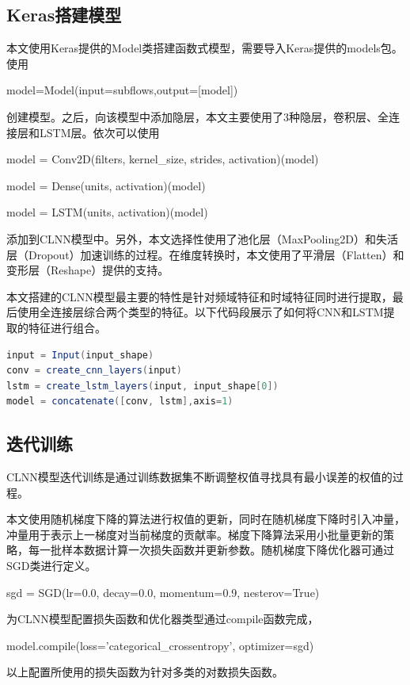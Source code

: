\subsection{Keras搭建模型}
本文使用Keras提供的Model类搭建函数式模型，需要导入Keras提供的models包。使用
\begin{center}
\monaco
model=Model(input=subflows,output=[model])
\end{center}
创建模型。之后，向该模型中添加隐层，本文主要使用了3种隐层，卷积层、全连接层和LSTM层。依次可以使用
\begin{center}
\monaco
model = Conv2D(filters, kernel\_size, strides, activation)(model)
\end{center}
\begin{center}
\monaco
model = Dense(units, activation)(model)
\end{center}
\begin{center}
\monaco
model = LSTM(units, activation)(model)
\end{center}
添加到CLNN模型中。另外，本文选择性使用了池化层（MaxPooling2D）和失活层（Dropout）加速训练的过程。在维度转换时，本文使用了平滑层（Flatten）和变形层（Reshape）提供的支持。

本文搭建的CLNN模型最主要的特性是针对频域特征和时域特征同时进行提取，最后使用全连接层综合两个类型的特征。以下代码段展示了如何将CNN和LSTM提取的特征进行组合。
\begin{lstlisting}[breaklines=true,language={Java},frame=single,basicstyle=\small\monaco,label={lst:storm},
keywordstyle=\color{blue!70},
rulesepcolor=\color{red!20!green!20!blue!20},escapeinside=``,
xleftmargin=1.5em,xrightmargin=1.5em, aboveskip=1em]
input = Input(input_shape)
conv = create_cnn_layers(input)
lstm = create_lstm_layers(input, input_shape[0])
model = concatenate([conv, lstm],axis=1)
\end{lstlisting}  

\subsection{迭代训练}
CLNN模型迭代训练是通过训练数据集不断调整权值寻找具有最小误差的权值的过程。

本文使用随机梯度下降的算法进行权值的更新，同时在随机梯度下降时引入冲量，冲量用于表示上一梯度对当前梯度的贡献率。梯度下降算法采用小批量更新的策略，每一批样本数据计算一次损失函数并更新参数。随机梯度下降优化器可通过SGD类进行定义。
\begin{center}
\monaco
sgd = SGD(lr=0.0, decay=0.0, momentum=0.9, nesterov=True)
\end{center}
为CLNN模型配置损失函数和优化器类型通过compile函数完成，
\begin{center}
\monaco
model.compile(loss='categorical\_crossentropy', optimizer=sgd)
\end{center}
以上配置所使用的损失函数为针对多类的对数损失函数。

